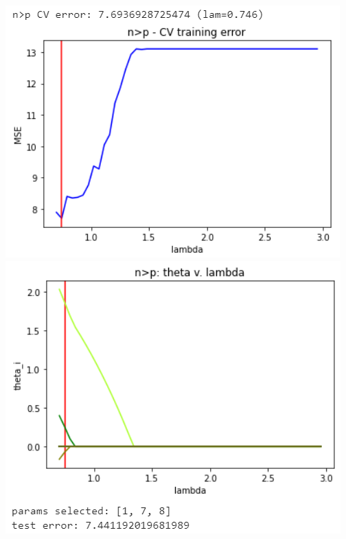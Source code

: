 \documentclass[11pt]{article}
\begin{document}
\begin{center}
\includegraphics[scale=0.7]{charts/ridge_exp_ortho_n_gt_p_err.PNG}
\includegraphics[scale=0.7]{charts/ridge_exp_ortho_n_gt_p_thetas.PNG}


\end{center}
\end{document}

